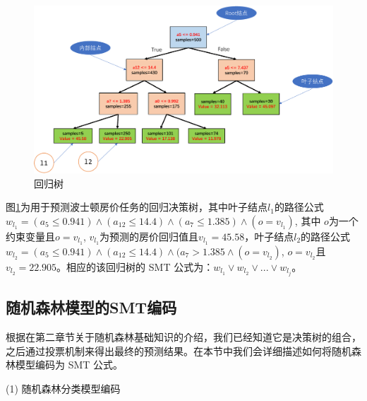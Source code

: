 \begin{figure}[!hbt]
\centering
	\includegraphics[scale=0.5]{fig2/C3/HGJCS.pdf}%
	\caption{回归树}
	\label{fig:回归树结构图}	
\end{figure}


\begin{ex}[回归决策树的SMT公式]\label{回归决策树例子}
图\ref{fig:回归树结构图}为用于预测波士顿房价任务的回归决策树，其中叶子结点$l_1$的路径公式$w_{l_{1}} = (a_5 \le 0.941) \wedge (a_{12} \le 14.4) \wedge (a_7 \le 1.385) \wedge (o = v_{l_{1}})$, 其中 $o$为一个约束变量且$o=v_{l_{1}}$, $v_{l_{1}}$为预测的房价回归值且$v_{l_{1}}=45.58$，叶子结点$l_2$的路径公式$w_{l_{2}} = (a_5 \le 0.941) \wedge (a_{12} \le 14.4) \wedge (a_7 > 1.385 \wedge (o = v_{l_{2}})$, $o=v_{l_{2}}$且$v_{l_{2}}=22.905$。相应的该回归树的 SMT 公式为：$w_{l_{1}} \vee w_{l_{2}} \vee ... \vee w_{l_{j}}$。
\end{ex}

\subsection{随机森林模型的SMT编码}
根据在第二章节关于随机森林基础知识的介绍，我们已经知道它是决策树的组合，之后通过投票机制来得出最终的预测结果。在本节中我们会详细描述如何将随机森林模型编码为 SMT 公式。

(1) 随机森林分类模型编码

